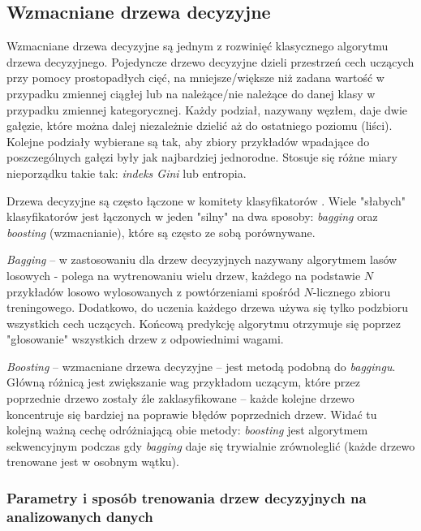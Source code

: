 \subsection{Wzmacniane drzewa decyzyjne}
\label{subsec:drzewa}

Wzmacniane drzewa decyzyjne są jednym z rozwinięć klasycznego algorytmu drzewa decyzyjnego. 
Pojedyncze drzewo decyzyjne dzieli przestrzeń cech uczących przy pomocy prostopadłych cięć, na mniejsze/większe niż zadana wartość w przypadku zmiennej ciągłej lub na należące/nie należące do danej klasy w przypadku zmiennej kategorycznej. Każdy podział, nazywany węzłem, daje dwie gałęzie, które można dalej niezależnie dzielić aż do ostatniego poziomu (liści). Kolejne podziały wybierane są tak, aby zbiory przykładów wpadające do poszczególnych gałęzi były jak najbardziej jednorodne. Stosuje się różne miary nieporządku takie tak: \textit{indeks Gini} lub entropia.

Drzewa decyzyjne są często łączone w komitety klasyfikatorów . Wiele "słabych" klasyfikatorów jest łączonych w jeden "silny" na dwa sposoby: \textit{bagging} oraz \textit{boosting} (wzmacnianie), które są często ze sobą porównywane.

\textit{Bagging} -- w zastosowaniu dla drzew decyzyjnych nazywany algorytmem lasów losowych  - polega na wytrenowaniu wielu drzew, każdego na podstawie $N$ przykładów losowo wylosowanych z powtórzeniami spośród $N$-licznego zbioru treningowego. Dodatkowo, do uczenia każdego drzewa używa się tylko podzbioru wszystkich cech uczących. Końcową predykcję algorytmu otrzymuje się poprzez "głosowanie" wszystkich drzew z odpowiednimi wagami.

\textit{Boosting} -- wzmacniane drzewa decyzyjne  -- jest metodą podobną do \textit{baggingu}. Główną różnicą jest zwiększanie wag przykładom uczącym, które przez poprzednie drzewo zostały źle zaklasyfikowane -- każde kolejne drzewo koncentruje się bardziej na poprawie błędów poprzednich drzew. Widać tu kolejną ważną cechę odróżniającą obie metody: \textit{boosting} jest algorytmem sekwencyjnym podczas gdy \textit{bagging} daje się trywialnie zrównoleglić (każde drzewo trenowane jest w osobnym wątku).



\subsubsection*{Parametry i sposób trenowania drzew decyzyjnych na analizowanych danych}

